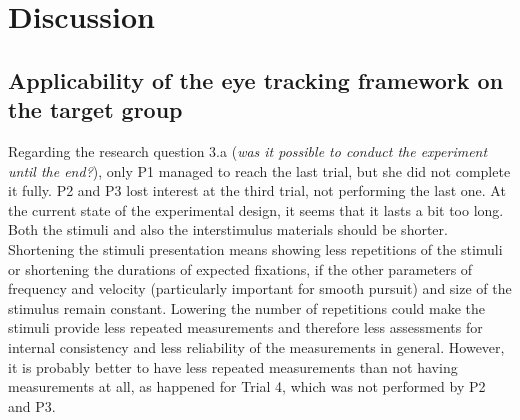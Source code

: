 \chapter{Discussion}
\label{chap:discussion}

\section{Applicability of the eye tracking framework on the target group}
\label{sec:discapplicability}

Regarding the research question 3.a (\textit{was it possible to conduct the experiment until the end?}), only P1 managed to reach the last trial, but she did not complete it fully. P2 and P3 lost interest at the third trial, not performing the last one. At the current state of the experimental design, it seems that it lasts a bit too long. Both the stimuli and also the interstimulus materials should be shorter. Shortening the stimuli presentation means showing less repetitions of the stimuli or shortening the durations of expected fixations, if the other parameters of frequency and velocity (particularly important for smooth pursuit) and size of the stimulus remain constant. Lowering the number of repetitions could make the stimuli provide less repeated measurements and therefore less assessments for internal consistency and less reliability of the measurements in general. However, it is probably better to have less repeated measurements than not having measurements at all, as happened for Trial 4, which was not performed by P2 and P3.

